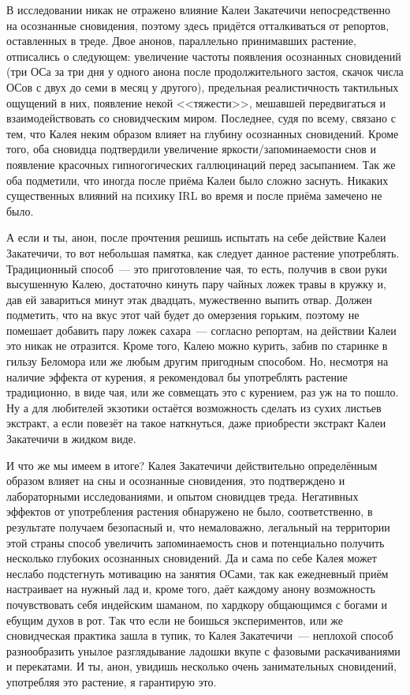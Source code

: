 \documentclass[a4paper,14pt,oneside]{memoir}
\begin{document}
В исследовании никак не отражено влияние Калеи Закатечичи непосредственно на осознанные сновидения, поэтому здесь придётся отталкиваться от репортов, оставленных в треде. Двое анонов, параллельно принимавших растение, отписались о следующем: увеличение частоты появления осознанных сновидений (три ОСа за три дня у одного анона после продолжительного застоя, скачок числа ОСов с двух до семи в месяц у другого), предельная реалистичность тактильных ощущений в них, появление некой <<тяжести>>, мешавшей передвигаться и взаимодействовать со сновидческим миром. Последнее, судя по всему, связано с тем, что Калея неким образом влияет на глубину осознанных сновидений. Кроме того, оба сновидца подтвердили увеличение яркости/запоминаемости снов и появление красочных гипногогических галлюцинаций перед засыпанием. Так же оба подметили, что иногда после приёма Калеи было сложно заснуть. Никаких существенных влияний на психику IRL во время и после приёма замечено не было.

А если и ты, анон, после прочтения решишь испытать на себе действие Калеи Закатечичи, то вот небольшая памятка, как следует данное растение употреблять. Традиционный способ~--- это приготовление чая, то есть, получив в свои руки высушенную Калею, достаточно кинуть пару чайных ложек травы в кружку и, дав ей завариться минут этак двадцать, мужественно выпить отвар. Должен подметить, что на вкус этот чай будет до омерзения горьким, поэтому не помешает добавить пару ложек сахара~--- согласно репортам, на действии Калеи это никак не отразится. Кроме того, Калею можно курить, забив по старинке в гильзу Беломора или же любым другим пригодным способом. Но, несмотря на наличие эффекта от курения, я рекомендовал бы употреблять растение традиционно, в виде чая, или же совмещать это с курением, раз уж на то пошло. Ну а для любителей экзотики остаётся возможность сделать из сухих листьев экстракт, а если повезёт на такое наткнуться, даже приобрести экстракт Калеи Закатечичи в жидком виде.

И что же мы имеем в итоге? Калея Закатечичи действительно определённым образом влияет на сны и осознанные сновидения, это подтверждено и лабораторными исследованиями, и опытом сновидцев треда. Негативных эффектов от употребления растения обнаружено не было, соответственно, в результате получаем безопасный и, что немаловажно, легальный на территории этой страны способ увеличить запоминаемость снов и потенциально получить несколько глубоких осознанных сновидений. Да и сама по себе Калея может неслабо подстегнуть мотивацию на занятия ОСами, так как ежедневный приём настраивает на нужный лад и, кроме того, даёт каждому анону возможность почувствовать себя индейским шаманом, по хардкору общающимся с богами и ебущим духов в рот. Так что если не боишься экспериментов, или же сновидческая практика зашла в тупик, то Калея Закатечичи~--- неплохой способ разнообразить унылое разглядывание ладошки вкупе с фазовыми раскачиваниями и перекатами. И ты, анон, увидишь несколько очень занимательных сновидений, употребляя это растение, я гарантирую это. 
\end{document}
